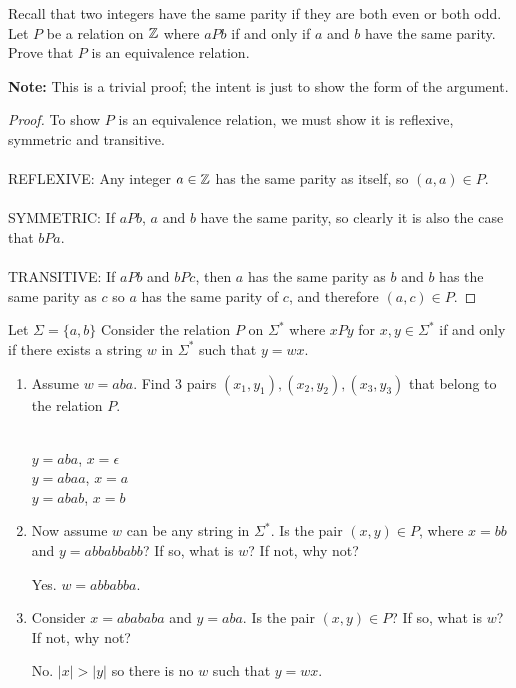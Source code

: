 \documentclass[]{exam}
\begin{document}
\begin{questions}
\question Recall that two integers have the same parity if they are both
          even or both odd. Let $P$ be a relation on $\mathbb{Z}$ where $aPb$
          if and only if $a$ and $b$ have the same parity. Prove that
          $P$ is an equivalence relation.

\begin{solution}
\textbf{Note:} This is a trivial proof; the intent is just to show the form of the
  argument.
\begin{proof}
To show $P$ is an equivalence relation, we must show it is reflexive, symmetric
and transitive.
\\~\\
REFLEXIVE: Any integer $a \in \mathbb{Z}$ has the same parity as itself, so $(a,a) \in
P$.
\\~\\
SYMMETRIC: If $aPb$, $a$ and $b$ have the same parity, so clearly it is also the
case that $bPa$.
\\~\\
TRANSITIVE: If $aPb$ and $bPc$, then $a$ has the same parity as $b$ and $b$ has
the same parity as $c$ so $a$ has the same parity of $c$, and therefore $(a,c)
\in P$. 
\end{proof}

\end{solution}

\question
Let $\Sigma = \{a,b\}$
Consider the relation $P$ on $\Sigma^*$ where $xPy$ for $x,y \in \Sigma^*$
if and only if there exists a string $w$ in $\Sigma^*$ such that $y = wx$. 
\begin{enumerate}[label=\alph*)]
\item Assume $w = aba$. Find $3$ pairs $(x_1,y_1),(x_2,y_2),(x_3,y_3)$ that belong
to the relation $P$.
\begin{solution}~\\
$y = aba$, $x = \epsilon$\\
$y = abaa$, $x = a$\\
$y = abab$, $x = b$\\
\end{solution}

\item Now assume $w$ can be any string in $\Sigma^*$. Is the pair $(x,y) \in P$,
where $x = bb$ and $y = abbabbabb$? If so, what is $w$? If not, why
not?
\begin{solution}
Yes. $w = abbabba$.
\end{solution}

\item Consider $x = abababa$ and $y = aba$. Is the pair $(x,y) \in P$? If so,
what is $w$? If not, why not?
\begin{solution}
No. $|x| > |y|$ so there is no $w$ such that $y = wx$.
\end{solution}


\end{enumerate}
\end{questions}
\end{document}
